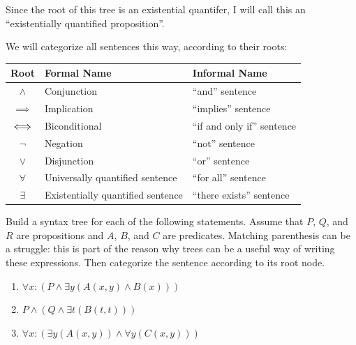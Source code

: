 Since the root of this tree is an existential quantifer, I will call this an ``existentially quantified proposition''.

We will categorize all sentences this way, according to their roots:

\begin{table}[h]
	\centering
	\begin{tabular}{c|l|l}
		Root & Formal Name & Informal Name 	\\ \hline
		$\wedge$ & Conjunction & ``and'' sentence\\ \hline
		$\implies$ & Implication & ``implies'' sentence\\ \hline
		$\Longleftrightarrow$ & Biconditional & ``if and only if'' sentence\\ \hline
		$\neg$ & Negation & ``not'' sentence\\ \hline
		$\vee$ & Disjunction & ``or'' sentence\\ \hline
		$\forall$ & Universally quantified sentence & ``for all'' sentence\\ \hline
		$\exists$ & Existentially quantified sentence & ``there exists'' sentence\\ \hline
	\end{tabular}
\end{table}

\begin{xca}
	Build a syntax tree for each of the following statements.  Assume that $P$, $Q$, and $R$ are propositions and $A$, $B$, and $C$ are predicates.  Matching parenthesis can be a struggle:  this is part of the reason why trees can be a useful way of writing these expressions.  Then categorize the sentence according to its root node.
	
	\begin{enumerate}
		\item $\forall x:  (P \wedge \exists y (A(x,y) \wedge B(x)))$
		\item $P \wedge (Q \wedge \exists t (B(t,t)) )$
		\item $\forall x: ( \exists y (A(x,y)) \wedge \forall y (C(x,y)))$
	\end{enumerate}
\end{xca}


